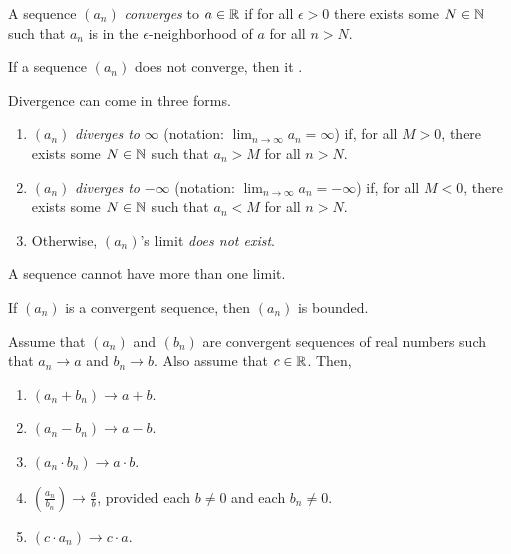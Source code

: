 \documentclass[11pt,twoside=off,numbers=noenddot]{scrbook}
\begin{document}
\begin{definition}
    A sequence $(a_n)$ \textit{converges} to $a \in \mathbb R$ if for all $\epsilon > 0$ there exists some $N \in \mathbb N$ such that $a_n$ is in the $\epsilon$-neighborhood of $a$ for all $n > N$.
\end{definition}

\begin{definition}
    If a sequence $(a_n)$ does not converge, then it .

    Divergence can come in three forms.
    \begin{enumerate}
        \item $(a_n)$ \textit{diverges to} $\infty$ (notation: $\lim_{n \to \infty} a_n = \infty$) if, for all $M > 0$, there exists some $N \in \mathbb N$ such that $a_n > M$ for all $n > N$.
        \item $(a_n)$ \textit{diverges to} $-\infty$ (notation: $\lim_{n \to \infty} a_n = -\infty$) if, for all $M < 0$, there exists some $N \in \mathbb N$ such that $a_n < M$ for all $n > N$.
        \item Otherwise, $(a_n)$'s limit \textit{does not exist}.
    \end{enumerate}
\end{definition}

\begin{proposition}
    A sequence cannot have more than one limit.
\end{proposition}

\begin{proposition}
    If $(a_n)$ is a convergent sequence, then $(a_n)$ is bounded.
\end{proposition}

\begin{theorem}
    Assume that $(a_n)$ and $(b_n)$ are convergent sequences of real numbers such that $a_n \to a$ and $b_n \to b$. Also assume that $c \in \mathbb R$. Then,
    \begin{enumerate}
        \item $(a_n + b_n) \to a + b$.
        \item $(a_n - b_n) \to a - b$.
        \item $(a_n \cdot b_n) \to a \cdot b$.
        \item $(\frac{a_n}{b_n}) \to \frac{a}{b}$, provided each $b \neq 0$ and each $b_n \neq 0$.
        \item $(c \cdot a_n) \to c \cdot a$.
    \end{enumerate}
\end{theorem}
\end{document}
